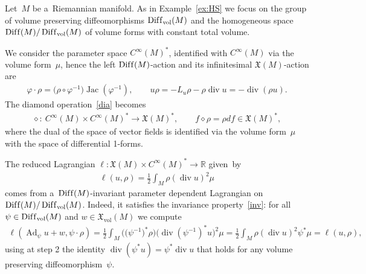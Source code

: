 \documentclass[10pt,a4paper]{amsart}
\numberwithin{equation}{section}
\begin{document}
\begin{Example}
Let~$M$ be a~Riemannian manifold.
As in Example~\ref{ex:HS} we focus on the group of volume preserving dif\/feomorphisms
$\operatorname{Dif\/f}_{\operatorname{vol}}(M)$ and the homogeneous space
$\operatorname{Dif\/f}(M)/\operatorname{Dif\/f}_{\operatorname{vol}}(M)$ of volume forms with constant total volume.

We consider the parameter space $C^{\infty}(M)^*$, identif\/ied with $C^{\infty}(M)$ via the volume form~$\mu$, hence the
left $\operatorname{Dif\/f}(M)$-action and its inf\/initesimal $\mathfrak X(M)$-action are
\begin{gather*}
\varphi\cdot\rho=\big(\rho\circ\varphi^{-1}\big)\operatorname{Jac}(\varphi^{-1}),
\qquad
u\rho =-L_u\rho-\rho\operatorname{div} u=-\operatorname{div}(\rho u).
\end{gather*}
The diamond operation~\eqref{dia} becomes
\begin{gather*}
\diamond: \ C^{\infty}(M)\times C^{\infty}(M)^*\to\mathfrak X(M)^*,
\qquad
f\diamond\rho=\rho df\in\mathfrak X(M)^*,
\end{gather*}
where the dual of the space of vector f\/ields is identif\/ied via the volume form~$\mu$ with the space of dif\/ferential 1-forms.

The reduced Lagrangian $\ell:\mathfrak X(M)\times C^{\infty}(M)^*\to\mathbb R$ given~by
\begin{gather*}
\ell(u,\rho)=\frac12\int_M\rho(\operatorname{div} u)^2\mu
\end{gather*}
comes from a~$\operatorname{Dif\/f}(M)$-invariant parameter dependent Lagrangian on
$\operatorname{Dif\/f}(M)/\operatorname{Dif\/f}_{\operatorname{vol}}(M)$.
Indeed, it satisf\/ies the invariance property~\eqref{inv}: for all $\psi\in\operatorname{Dif\/f}_{\operatorname{vol}}(M)$
and $w\in\mathfrak X_{\operatorname{vol}}(M)$ we compute
\begin{gather*}
\ell(\operatorname{Ad}_\psi u+w,\psi\cdot\rho)
=\frac12\int_M\big(\big(\psi^{-1}\big)^*\rho\big)\big(\operatorname{div}(\psi^{-1})^*u\big)^2\mu
=\frac12\int_M\rho(\operatorname{div} u)^2\psi^*\mu=\ell(u,\rho),
\end{gather*}
using at step 2 the identity $\operatorname{div}(\psi^*u)=\psi^*\operatorname{div} u$ that holds for any volume
preserving dif\/feo\-mor\-phism~$\psi$.


\end{Example}
\end{document}
